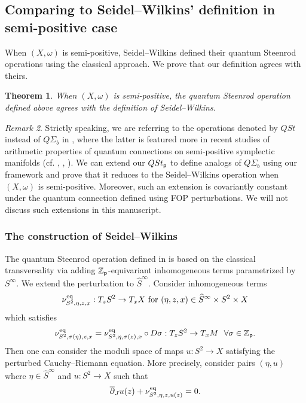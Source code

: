 \documentclass[reqno, 10pt]{amsart}
\numberwithin{equation}{section}
\numberwithin{equation}{section}
\newtheorem{thm}{Theorem}[section]
\theoremstyle{definition}
\theoremstyle{remark}
\newtheorem{rem}[thm]{Remark}
\newcommand{\beqn}{\begin{equation*}}
\newcommand{\eeqn}{\end{equation*}}
\newcommand{\ov}{\overline}
\newcommand{\mb}{\mathbb}
\newcommand{\p}{{\sf p}}
\newcommand{\zp}{{{\mb Z}_{\sf p}}}
\newcommand{\wh}{\widehat}
\begin{document}
\subsection{Comparing to Seidel--Wilkins' definition in semi-positive case}

When $(X, \omega)$ is semi-positive, Seidel--Wilkins \cite{Seidel_Wilkins_2022} defined their quantum Steenrod operations using the classical approach. We prove that our definition agrees with theirs.

\begin{thm}\label{thm_steenrod_comparison}
When $(X, \omega)$ is semi-positive, the quantum Steenrod operation defined above agrees with the definition of Seidel--Wilkins.
\end{thm}

\begin{rem}
    Strictly speaking, we are referring to the operations denoted by $QSt$ instead of $Q\Sigma_b$ in \cite{Seidel_Wilkins_2022}, where the latter is featured more in recent studies of arithmetic properties of quantum connections on semi-positive symplectic manifolds (cf. \cite{chen2024quantumsteenrod, chen2024exponential}, \cite{jae, Lee23b}, \cite{bai-lee, bai2026}). We can extend our $QSt_\p$ to define analogs of $Q\Sigma_b$ using our framework and prove that it reduces to the Seidel--Wilkins operation when $(X, \omega)$ is semi-positive. Moreover, such an extension is covariantly constant under the quantum connection defined using FOP perturbations. We will not discuss such extensions in this manuscript.
\end{rem}

\subsubsection{The construction of Seidel--Wilkins}

The quantum Steenrod operation defined in \cite{Seidel_Wilkins_2022} is based on the classical transversality via adding $\zp$-equivariant inhomogeneous terms parametrized by $S^\infty$. We extend the perturbation to $\wh S^\infty$. Consider inhomogeneous terms 
\beqn
\nu_{S^2, \eta, z, x}^{\rm eq}: T_z S^2 \to T_x X\ {\rm for\ } (\eta, z, x) \in \wh S^\infty \times S^2 \times X
\eeqn
which satisfies
\beqn
\nu_{S^2, \sigma (\eta), z, x}^{\rm eq} = \nu_{S^2, \eta, \sigma(z), x}^{\rm eq} \circ D \sigma: T_z S^2 \to T_x M\ \ \forall \sigma \in \zp.
\eeqn
Then one can consider the moduli space of maps $u: S^2 \to X$ satisfying the perturbed Cauchy--Riemann equation. More precisely, consider pairs $(\eta, u)$ where $\eta \in \wh S^\infty$ and $u: S^2 \to X$ such that
\beqn
\ov\partial_J u(z) + \nu_{S^2, \eta, z, u(z)}^{\rm eq} = 0.
\eeqn
\end{document}

